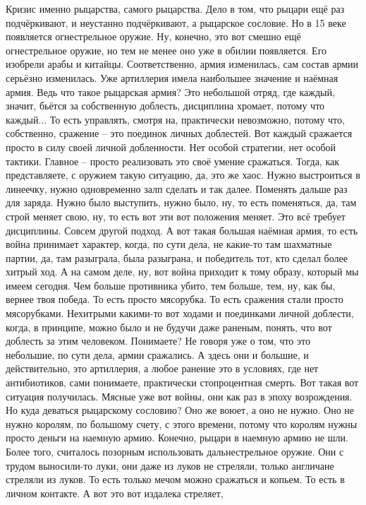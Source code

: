 Кризис именно
рыцарства, самого рыцарства. Дело в том, что рыцари ещё раз подчёркивают, и
неустанно подчёркивают, а рыцарское сословие. Но в 15 веке появляется
огнестрельное оружие. Ну, конечно, это вот смешно ещё огнестрельное оружие, но
тем не менее оно уже в обилии появляется. Его изобрели арабы и китайцы.
Соответственно, армия изменилась, сам состав армии серьёзно изменилась. Уже
артиллерия имела наибольшее значение и наёмная армия. Ведь что такое рыцарская
армия? Это небольшой отряд, где каждый, значит, бьётся за собственную доблесть,
дисциплина хромает, потому что каждый... То есть управлять, смотря на,
практически невозможно, потому что, собственно, сражение – это поединок личных
доблестей. Вот каждый сражается просто в силу своей личной добленности. Нет
особой стратегии, нет особой тактики. Главное – просто реализовать это своё
умение сражаться. Тогда, как представляете, с оружием такую ситуацию, да, это же
хаос. Нужно выстроиться в линеечку, нужно одновременно залп сделать и так далее.
Поменять дальше раз для заряда. Нужно было выступить, нужно было, ну, то есть
поменяться, да, там строй меняет свою, ну, то есть вот эти вот положения меняет.
Это всё требует дисциплины. Совсем другой подход. А вот такая большая наёмная
армия, то есть война принимает характер, когда, по сути дела, не какие-то там
шахматные партии, да, там разыграла, была разыграна, и победитель тот, кто
сделал более хитрый ход. А на самом деле, ну, вот война приходит к тому образу,
который мы имеем сегодня. Чем больше противника убито, тем больше, тем, ну, как
бы, вернее твоя победа. То есть просто мясорубка. То есть сражения стали просто
мясорубками. Нехитрыми какими-то вот ходами и поединками личной доблести, когда,
в принципе, можно было и не будучи даже раненым, понять, что вот доблесть за
этим человеком. Понимаете? Не говоря уже о том, что это небольшие, по сути дела,
армии сражались. А здесь они и большие, и действительно, это артиллерия, а любое
ранение это в условиях, где нет антибиотиков, сами понимаете, практически
стопроцентная смерть. Вот такая вот ситуация получилась. Мясные уже вот войны,
они как раз в эпоху возрождения. Но куда деваться рыцарскому сословию? Оно же
воюет, а оно не нужно. Оно не нужно королям, по большому счету, с этого времени,
потому что королям нужны просто деньги на наемную армию. Конечно, рыцари в
наемную армию не шли. Более того, считалось позорным использовать
дальнестрельное оружие. Они с трудом выносили-то луки, они даже из луков не
стреляли, только англичане стреляли из луков. То есть только мечом можно
сражаться и копьем. То есть в личном контакте. А вот это вот издалека стреляет,
